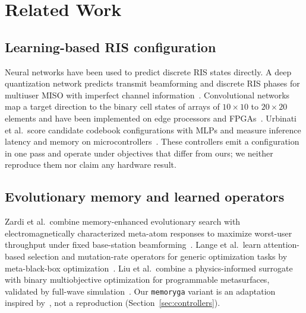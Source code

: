 \documentclass[conference]{IEEEtran}
\newcommand{\mth}[1]{\begingroup\renewcommand{\_}{\textunderscore\allowbreak}\texttt{#1}\endgroup}
\begin{document}
\section{Related Work}\label{sec:related}
\subsection{Learning-based RIS configuration}
Neural networks have been used to predict discrete RIS states directly. A deep quantization network predicts transmit beamforming and discrete RIS phases for multiuser MISO with imperfect channel information~\cite{xu}. Convolutional networks map a target direction to the binary cell states of arrays of $10\times10$ to $20\times20$ elements and have been implemented on edge processors and FPGAs~\cite{martin,padial}. Urbinati et al.\ score candidate codebook configurations with MLPs and measure inference latency and memory on microcontrollers~\cite{urbinati}. These controllers emit a configuration in one pass and operate under objectives that differ from ours; we neither reproduce them nor claim any hardware result.

\subsection{Evolutionary memory and learned operators}
Zardi et al.\ combine memory-enhanced evolutionary search with electromagnetically characterized meta-atom responses to maximize worst-user throughput under fixed base-station beamforming~\cite{zardi}. Lange et al.\ learn attention-based selection and mutation-rate operators for generic optimization tasks by meta-black-box optimization~\cite{lange}. Liu et al.\ combine a physics-informed surrogate with binary multiobjective optimization for programmable metasurfaces, validated by full-wave simulation~\cite{liuphys}. Our \mth{memory\_ga} variant is an adaptation inspired by~\cite{zardi}, not a reproduction (Section~\ref{sec:controllers}).
\end{document}
